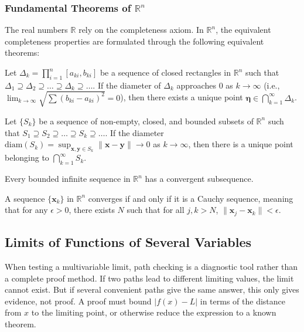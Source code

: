 \subsubsection{Fundamental Theorems of $\mathbb{R}^n$}

The real numbers $\mathbb{R}$ rely on the completeness axiom. In $\mathbb{R}^n$, the equivalent completeness properties are formulated through the following equivalent theorems:

\begin{theorem}
Let $\Delta_k = \prod_{i=1}^n [a_{ki}, b_{ki}]$ be a sequence of closed rectangles in $\mathbb{R}^n$ such that $\Delta_1 \supseteq \Delta_2 \supseteq \dots \supseteq \Delta_k \supseteq \dots$. If the diameter of $\Delta_k$ approaches $0$ as $k \to \infty$ (i.e., $\lim_{k \to \infty} \sqrt{\sum (b_{ki} - a_{ki})^2} = 0$), then there exists a unique point $\mathbf{\eta} \in \bigcap_{k=1}^{\infty} \Delta_k$.
\end{theorem}

\begin{theorem}
Let $\{S_k\}$ be a sequence of non-empty, closed, and bounded subsets of $\mathbb{R}^n$ such that $S_1 \supseteq S_2 \supseteq \dots \supseteq S_k \supseteq \dots$. If the diameter $\text{diam}(S_k) = \sup_{\mathbf{x}, \mathbf{y} \in S_k} \|\mathbf{x} - \mathbf{y}\| \to 0$ as $k \to \infty$, then there is a unique point belonging to $\bigcap_{k=1}^{\infty} S_k$.
\end{theorem}

\begin{theorem}
Every bounded infinite sequence in $\mathbb{R}^n$ has a convergent subsequence.
\end{theorem}

\begin{theorem}
A sequence $\{\mathbf{x}_k\}$ in $\mathbb{R}^n$ converges if and only if it is a Cauchy sequence, meaning that for any $\epsilon > 0$, there exists $N$ such that for all $j, k > N$, $\|\mathbf{x}_j - \mathbf{x}_k\| < \epsilon$.
\end{theorem}

\subsection{Limits of Functions of Several Variables}


When testing a multivariable limit, path checking is a diagnostic tool rather than a complete proof method. If two paths lead to different limiting values, the limit cannot exist. But if several convenient paths give the same answer, this only gives evidence, not proof. A proof must bound $|f(x)-L|$ in terms of the distance from $x$ to the limiting point, or otherwise reduce the expression to a known theorem.

